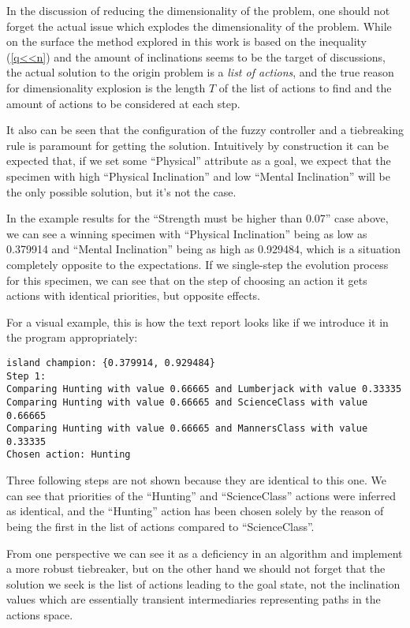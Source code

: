 \documentclass[12pt, a4paper]{report}
\begin{document}
	In the discussion of reducing the dimensionality of the problem, one should not forget the actual issue which explodes the dimensionality of the problem.
	While on the surface the method explored in this work is based on the inequality (\ref{q<<n}) and the amount of inclinations seems to be the target of discussions, the actual solution to the origin problem is a \textit{list of actions}, and the true reason for dimensionality explosion is the length $T$ of the list of actions to find and the amount of actions to be considered at each step.
	
	It also can be seen that the configuration of the fuzzy controller and a tiebreaking rule is paramount for getting the solution.
	Intuitively by construction it can be expected that, if we set some ``Physical'' attribute as a goal, we expect that the specimen with high ``Physical Inclination'' and low ``Mental Inclination'' will be the only possible solution, but it's not the case.
	
	In the example results for the ``Strength must be higher than 0.07'' case above, we can see a winning specimen with ``Physical Inclination'' being as low as 0.379914 and ``Mental Inclination'' being as high as 0.929484,
	which is a situation completely opposite to the expectations.
	If we single-step the evolution process for this specimen, we can see that on the step of choosing an action it gets actions with identical priorities, but opposite effects.
	
	For a visual example, this is how the text report looks like if we introduce it in the program appropriately:
	
	\begin{verbatim}
island champion: {0.379914, 0.929484}
Step 1:
Comparing Hunting with value 0.66665 and Lumberjack with value 0.33335
Comparing Hunting with value 0.66665 and ScienceClass with value 0.66665
Comparing Hunting with value 0.66665 and MannersClass with value 0.33335
Chosen action: Hunting
	\end{verbatim}
	
	Three following steps are not shown because they are identical to this one.
	We can see that priorities of the ``Hunting'' and ``ScienceClass'' actions were inferred as identical,
	and the ``Hunting'' action has been chosen solely by the reason of being the first in the list of actions compared to ``ScienceClass''.
	
	From one perspective we can see it as a deficiency in an algorithm and implement a more robust tiebreaker, but on the other hand we should not forget that the solution we seek is the list of actions leading to the goal state,
	not the inclination values which are essentially transient intermediaries representing paths in the actions space.
	
\end{document}
